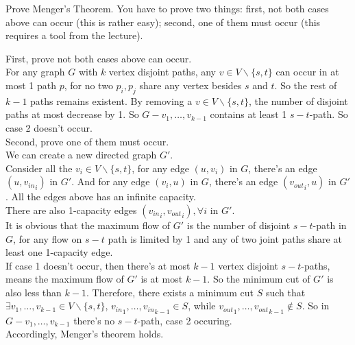\documentclass[11pt,a4paper,oneside]{article}
\begin{document}
\begin{problem}{3}
	\statement
   Prove Menger's Theorem. You have to prove two things: first, not both cases above can occur (this is rather easy);
   second, one of them must occur (this requires a tool from the lecture).
   
    \solution
    First, prove not both cases above can occur.\\
    For any graph $G$ with $k$ vertex disjoint paths, any $v \in V \backslash \{ s,t \}$ can occur in at most 1 path $p$, for no two $p_i,p_j$ share any vertex besides $s$ and $t$. So the rest of $k - 1$ paths remains existent. By removing a $v \in V \backslash \{ s,t \}$, the number of disjoint paths at most decrease by 1. So $G - {v_1,\dots,v_{k - 1}}$ contains at least 1 $s-t$-path. So case 2 doesn't occur.\\
    Second, prove one of them must occur.\\
    We can create a new directed graph $G'$.\\
    Consider all the $v_i \in V \backslash \{ s,t \}$, for any edge $(u,v_i)$ in $G$, there's an edge $(u,{v_{in}}_i)$ in $G'$. And for any edge $(v_i,u)$ in $G$, there's an edge $({v_{out}}_i,u)$ in $G'$. All the edges above has an infinite capacity.\\
    There are also 1-capacity edges $({v_{in}}_i,{v_{out}}_i) ,\forall i$ in $G'$.\\
    It is obvious that the maximum flow of $G'$ is the number of disjoint $s-t$-path in $G$, for any flow on $s-t$ path is limited by 1 and any of two joint paths share at least one 1-capacity edge.\\
    If case 1 doesn't occur, then there's at most $k - 1$ vertex disjoint $s-t$-paths, means the maximum flow of $G'$ is at most $k - 1$. So the minimum cut of $G'$ is also less than $k - 1$. Therefore, there exists a minimum cut $S$ such that $\exists v_1,\dots,v_{k-1} \in V \backslash \{ s,t \}$, ${v_{in}}_1,\dots,{v_{in}}_{k-1} \in S$, while ${v_{out}}_1,\dots,{v_{out}}_{k-1} \notin S$. So in $G-{v_1,\dots, v_{k - 1}}$ there's no $s-t$-path, case 2 occuring.\\
    Accordingly, Menger's theorem holds.

\end{problem}
\end{document}
